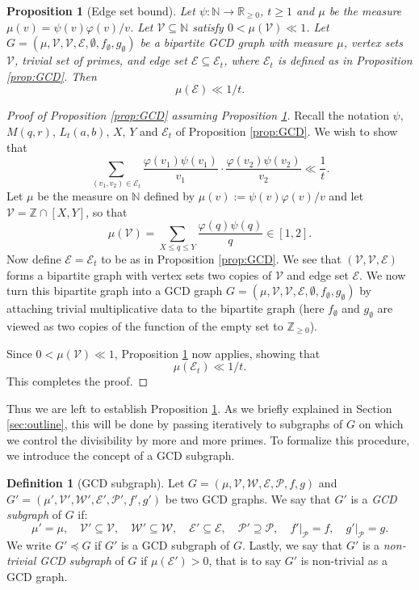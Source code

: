 \documentclass[12pt]{amsart}
\numberwithin{equation}{section}
\newtheorem{prop}[lem]{Proposition}
\theoremstyle{definition}
\newtheorem{dfn}[lem]{Definition}
\theoremstyle{remark}
\newcommand{\N}{\mathbb{N}}
\newcommand{\Z}{\mathbb{Z}}
\newcommand{\R}{\mathbb{R}}
\newcommand{\CE}{\mathcal{E}}
\newcommand{\CP}{\mathcal{P}}
\newcommand{\CV}{\mathcal{V}}
\newcommand{\CW}{\mathcal{W}}
\renewcommand{\phi}{\varphi}
\renewcommand{\le}{\leqslant}
\renewcommand{\ge}{\geqslant}
\begin{document}
\begin{prop}[Edge set bound]\label{prop:Graph}
	Let $\psi:\N\rightarrow\R_{\ge 0}$, $t\ge1$ and $\mu$ be the measure $\mu(v)=\psi(v)\phi(v)/v$. Let $\CV\subseteq\N$ satisfy $0<\mu(\CV)\ll 1$. Let  $G=(\mu,\CV,\CV,\CE,\emptyset,f_\emptyset,g_\emptyset)$ be a bipartite GCD graph with measure $\mu$, vertex sets $\CV$, trivial set of primes, and edge set $\CE\subseteq\CE_t$, where $\CE_t$ is defined as in Proposition \ref{prop:GCD}. Then
	\[
	\mu(\CE)\ll 1/t.
	\]
\end{prop}


\begin{proof}[Proof of Proposition \ref{prop:GCD} assuming Proposition \ref{prop:Graph}]
	Recall the notation $\psi$, $M(q,r)$, $L_t(a,b)$, $X$, $Y$ and $\CE_t$ of Proposition \ref{prop:GCD}. We wish to show that
	\begin{equation}
	\sum_{(v_1,v_2)\in \CE_t} \frac{\phi(v_1)\psi(v_1)}{v_1}\cdot \frac{\phi(v_2)\psi(v_2)}{v_2}
	\ll  \frac{1}{t}  .
	\label{eq:Target}
	\end{equation}
	Let $\mu$ be the measure on $\N$ defined by $\mu(v):=\psi(v)\phi(v)/v$ and let $\CV=\Z\cap[X,Y]$, 
	so that
	\[
	\mu(\CV)=\sum_{X\le q\le Y}\frac{\phi(q)\psi(q)}{q}\in[1,2].
	\]
	Now define $\CE=\CE_t$ to be as in Proposition \ref{prop:GCD}. We see that $(\CV,\CV,\CE)$ forms a bipartite graph with vertex sets two copies of $\CV$ and edge set $\CE$. We now turn this bipartite graph into a GCD graph $G=(\mu,\CV,\CV,\CE,\emptyset,f_\emptyset,g_\emptyset)$ by attaching trivial multiplicative data to the bipartite graph (here $f_\emptyset$ and $g_\emptyset$ are viewed as two copies of the function of the empty set to $\mathbb{Z}_{\ge 0}$).
	
	Since $0<\mu(\CV)\ll 1$, Proposition \ref{prop:Graph} now applies, showing that
	\[
	\mu(\CE_t)\ll 1/t.
	\]
	This completes the proof.
\end{proof}


Thus we are left to establish Proposition \ref{prop:Graph}. As we briefly explained in Section \ref{sec:outline}, this will be done by passing iteratively to subgraphs of $G$ on which we control the divisibility by more and more primes. To formalize this procedure, we introduce the concept of a GCD subgraph.

\begin{dfn}[GCD subgraph]
Let $G=(\mu,\CV,\CW,\CE,\CP,f,g)$ and $G'=(\mu',\CV',\CW',\CE',\CP',f',g')$ be two GCD graphs. We say that $G'$ is a \emph{GCD subgraph} of $G$ if:
	\[
	\mu'=\mu,\quad \CV'\subseteq\CV,\quad \CW'\subseteq\CW,\quad \CE'\subseteq\CE,
	\quad \CP'\supseteq\CP, \quad f'\big|_{\CP}=f,\quad
	 g'\big|_{\CP}=g.
	\]
	We write $G'\preceq G$ if $G'$ is a GCD subgraph of $G$. Lastly, we say that $G'$ is a {\it non-trivial GCD subgraph} of $G$ if $\mu(\CE')>0$, that is to say $G'$ is non-trivial as a GCD graph.
\end{dfn}
\end{document}
